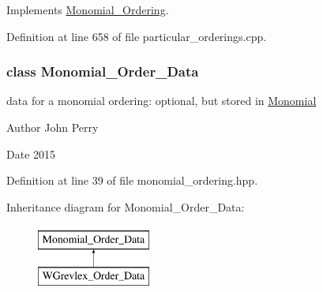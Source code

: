 Implements \hyperlink{group__orderinggroup_ab6c02638f87382f7a9a95b994e9a5dfb}{Monomial\+\_\+\+Ordering}.



Definition at line 658 of file particular\+\_\+orderings.\+cpp.

\label{class_monomial___order___data}
\subsubsection{class Monomial\+\_\+\+Order\+\_\+\+Data}
data for a monomial ordering\+: optional, but stored in {\ttfamily \hyperlink{group__polygroup_class_monomial}{Monomial}} 

\begin{DoxyAuthor}{Author}
John Perry 
\end{DoxyAuthor}
\begin{DoxyDate}{Date}
2015 
\end{DoxyDate}


Definition at line 39 of file monomial\+\_\+ordering.\+hpp.

Inheritance diagram for Monomial\+\_\+\+Order\+\_\+\+Data\+:\begin{figure}[H]
\begin{center}
\leavevmode
\includegraphics[height=2.000000cm]{group__orderinggroup}
\end{center}
\end{figure}
